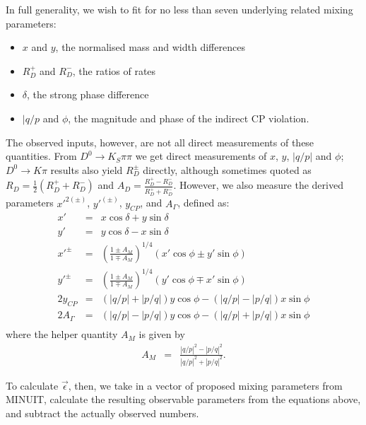 \documentclass[12pt,pdflatex]{article}
\begin{document}
In full generality, we wish to fit for no less than seven underlying
related mixing parameters:
\begin{itemize}
\item $x$ and $y$, the normalised mass and width differences
\item $R_D^+$ and $R_D^-$, the ratios of rates
\item $\delta$, the strong phase difference
\item $|q/p$ and $\phi$, the magnitude and phase of the indirect CP violation. 
\end{itemize}
The observed inputs, however, are not all direct measurements of these
quantities. From $D^0\to K_S\pi\pi$ we get direct measurements of $x$, $y$, $|q/p|$ and $\phi$;
$D^0\to K\pi$ results also yield $R_D^\pm$ directly, although sometimes quoted
as $R_D = \frac{1}{2}(R_D^+ + R_D^-)$ and $A_D = \frac{R_D^+ - R_D^-}{R_D^+ + R_D^-}$.
However, we also measure the derived parameters $x'^{2(\pm)}$, $y'^{(\pm)}$, $y_{CP}$, and $A_\Gamma$,
defined as:
\begin{eqnarray}
x' &=& x\cos\delta + y\sin\delta \\
y' &=& y\cos\delta - x\sin\delta \\
x'^{\pm} &=& \left(\frac{1\pm A_M}{1\mp A_M}\right)^{1/4}\left(x'\cos\phi \pm y'\sin\phi\right) \\
y'^{\pm} &=& \left(\frac{1\pm A_M}{1\mp A_M}\right)^{1/4}\left(y'\cos\phi \mp x'\sin\phi\right) \\
2y_{CP}  &=& \left(|q/p|+|p/q|\right)y\cos\phi - \left(|q/p|-|p/q|\right)x\sin\phi\\
2A_\Gamma  &=& \left(|q/p|-|p/q|\right)y\cos\phi - \left(|q/p|+|p/q|\right)x\sin\phi\\
\end{eqnarray}
where the helper quantity $A_M$ is given by
\begin{eqnarray}
A_M &=& \frac{|q/p|^2 - |p/q|^2}{|q/p|^2 + |p/q|^2}. 
\end{eqnarray}

To calculate $\vec\epsilon$, then, we take in a vector of proposed mixing parameters
from MINUIT, calculate the resulting observable parameters from the equations above, 
and subtract the actually observed numbers.
\end{document}
